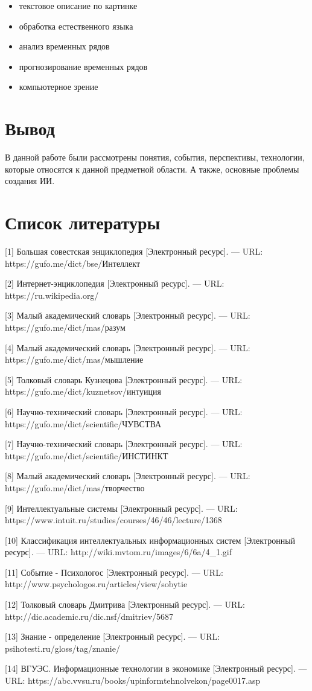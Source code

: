 \documentclass[14pt,a4paper,report]{report}
\begin{document}
\begin{itemize}
	\item текстовое описание по картинке
	\item обработка естественного языка
	\item анализ временных рядов
	\item прогнозирование временных рядов
	\item компьютерное зрение
\end{itemize}

\section{Вывод}

В данной работе были рассмотрены понятия, события, перспективы, технологии, которые относятся к данной предметной области. А также, основные проблемы создания ИИ.

\clearpage

\section{Список литературы}

\begin{flushleft}

[1] Большая совестская энциклопедия [Электронный ресурс]. — URL: https://gufo.me/dict/bse/Интеллект

[2] Интернет-энциклопедия [Электронный ресурс]. — URL: https://ru.wikipedia.org/

[3] Малый академический словарь [Электронный ресурс]. — URL: https://gufo.me/dict/mas/разум

[4] Малый академический словарь [Электронный ресурс]. — URL: https://gufo.me/dict/mas/мышление

[5] Толковый словарь Кузнецова [Электронный ресурс]. — URL: https://gufo.me/dict/kuznetsov/интуиция

[6] Научно-технический словарь [Электронный ресурс]. — URL: https://gufo.me/dict/scientific/ЧУВСТВА

[7] Научно-технический словарь [Электронный ресурс]. — URL: https://gufo.me/dict/scientific/ИНСТИНКТ

[8] Малый академический словарь [Электронный ресурс]. — URL: https://gufo.me/dict/mas/творчество

[9] Интеллектуальные системы [Электронный ресурс]. — URL: https://www.intuit.ru/studies/courses/46/46/lecture/1368

[10] Классификация интеллектуальных информационных систем [Электронный ресурс]. — URL: http://wiki.mvtom.ru/images/6/6a/4_1.gif

[11] Событие - Психологос [Электронный ресурс]. — URL: http://www.psychologos.ru/articles/view/sobytie

[12] Толковый словарь Дмитрива [Электронный ресурс]. — URL: http://dic.academic.ru/dic.nsf/dmitriev/5687

[13] Знание - определение [Электронный ресурс]. — URL: psihotesti.ru/gloss/tag/znanie/

[14] ВГУЭС. Информационные технологии в экономике [Электронный ресурс]. — URL: https://abc.vvsu.ru/books/upinformtehnolvekon/page0017.asp

\end{flushleft}
	
\end{document}
